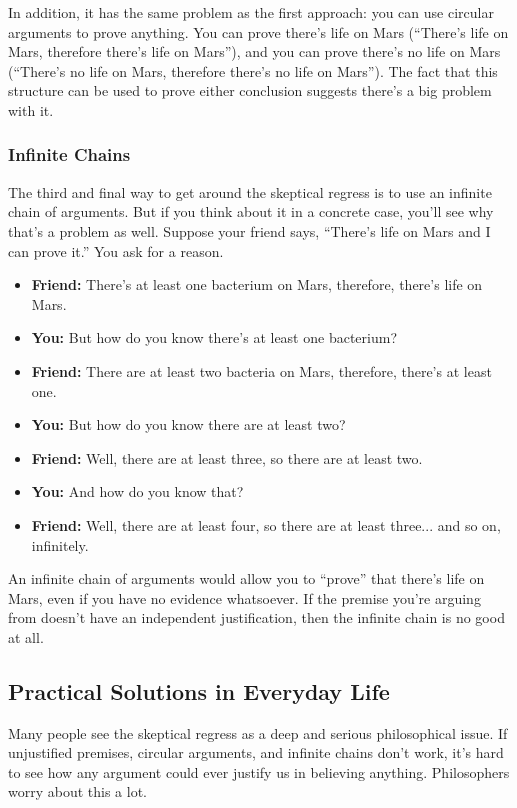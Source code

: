 \documentclass[12pt]{article}
\begin{document}
In addition, it has the same problem as the first approach: you can use circular arguments to prove anything. You can prove there's life on Mars (``There's life on Mars, therefore there's life on Mars''), and you can prove there's no life on Mars (``There's no life on Mars, therefore there's no life on Mars''). The fact that this structure can be used to prove either conclusion suggests there's a big problem with it.

\subsubsection{Infinite Chains}
The third and final way to get around the skeptical regress is to use an infinite chain of arguments. But if you think about it in a concrete case, you'll see why that's a problem as well. Suppose your friend says, ``There's life on Mars and I can prove it.'' You ask for a reason.
\begin{itemize}
    \item \textbf{Friend:} There's at least one bacterium on Mars, therefore, there's life on Mars.
    \item \textbf{You:} But how do you know there's at least one bacterium?
    \item \textbf{Friend:} There are at least two bacteria on Mars, therefore, there's at least one.
    \item \textbf{You:} But how do you know there are at least two?
    \item \textbf{Friend:} Well, there are at least three, so there are at least two.
    \item \textbf{You:} And how do you know that?
    \item \textbf{Friend:} Well, there are at least four, so there are at least three... and so on, infinitely.
\end{itemize}
An infinite chain of arguments would allow you to ``prove'' that there's life on Mars, even if you have no evidence whatsoever. If the premise you're arguing from doesn't have an independent justification, then the infinite chain is no good at all.

\subsection{Practical Solutions in Everyday Life}
Many people see the skeptical regress as a deep and serious philosophical issue. If unjustified premises, circular arguments, and infinite chains don't work, it's hard to see how any argument could ever justify us in believing anything. Philosophers worry about this a lot.
\end{document}
